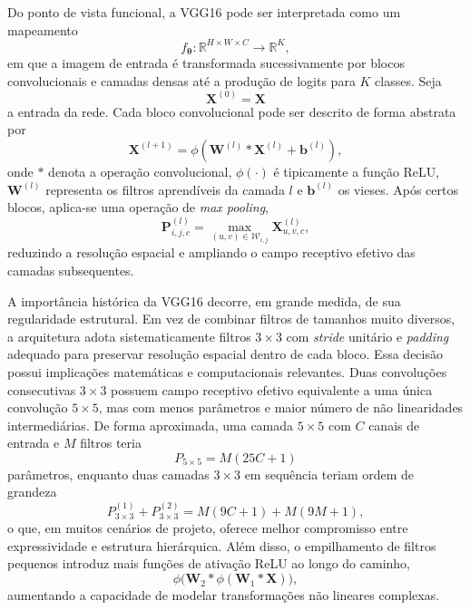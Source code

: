\documentclass[tcc,capa]{texufpel}
\begin{document}
Do ponto de vista funcional, a VGG16 pode ser interpretada como um mapeamento
\begin{equation}
	f_{\boldsymbol{\theta}} : \mathbb{R}^{H \times W \times C} \rightarrow \mathbb{R}^{K},
\end{equation}
em que a imagem de entrada é transformada sucessivamente por blocos convolucionais e camadas densas até a produção de logits para \(K\) classes. Seja
\begin{equation}
	\mathbf{X}^{(0)} = \mathbf{X}
\end{equation}
a entrada da rede. Cada bloco convolucional pode ser descrito de forma abstrata por
\begin{equation}
	\mathbf{X}^{(l+1)} = \phi\!\left(\mathbf{W}^{(l)} * \mathbf{X}^{(l)} + \mathbf{b}^{(l)}\right),
\end{equation}
onde \(*\) denota a operação convolucional, \(\phi(\cdot)\) é tipicamente a função ReLU, \(\mathbf{W}^{(l)}\) representa os filtros aprendíveis da camada \(l\) e \(\mathbf{b}^{(l)}\) os vieses. Após certos blocos, aplica-se uma operação de \textit{max pooling},
\begin{equation}
	\mathbf{P}^{(l)}_{i,j,c}
	=
	\max_{(u,v)\in \mathcal{W}_{i,j}}
	\mathbf{X}^{(l)}_{u,v,c},
\end{equation}
reduzindo a resolução espacial e ampliando o campo receptivo efetivo das camadas subsequentes.

A importância histórica da VGG16 decorre, em grande medida, de sua regularidade estrutural. Em vez de combinar filtros de tamanhos muito diversos, a arquitetura adota sistematicamente filtros \(3\times 3\) com \textit{stride} unitário e \textit{padding} adequado para preservar resolução espacial dentro de cada bloco. Essa decisão possui implicações matemáticas e computacionais relevantes. Duas convoluções consecutivas \(3\times 3\) possuem campo receptivo efetivo equivalente a uma única convolução \(5\times 5\), mas com menos parâmetros e maior número de não linearidades intermediárias. De forma aproximada, uma camada \(5\times 5\) com \(C\) canais de entrada e \(M\) filtros teria
\begin{equation}
	P_{5\times 5} = M(25C + 1)
\end{equation}
parâmetros, enquanto duas camadas \(3\times 3\) em sequência teriam ordem de grandeza
\begin{equation}
	P_{3\times 3}^{(1)} + P_{3\times 3}^{(2)}
	=
	M(9C + 1) + M(9M + 1),
\end{equation}
o que, em muitos cenários de projeto, oferece melhor compromisso entre expressividade e estrutura hierárquica. Além disso, o empilhamento de filtros pequenos introduz mais funções de ativação ReLU ao longo do caminho,
\begin{equation}
	\phi\big(\mathbf{W}_2 * \phi(\mathbf{W}_1 * \mathbf{X})\big),
\end{equation}
aumentando a capacidade de modelar transformações não lineares complexas.
\end{document}
